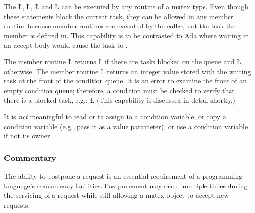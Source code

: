 \documentclass[openright,twoside]{report}
\begin{document}
\begin{annotation}
The \LGinlinetrue\LGbegin\lgrinde\L{}\endlgrinde\LGend{}, \LGinlinetrue\LGbegin\lgrinde\L{}\endlgrinde\LGend{}, \LGinlinetrue\LGbegin\lgrinde\L{}\endlgrinde\LGend{} and \LGinlinetrue\LGbegin\lgrinde\L{}\endlgrinde\LGend{} can be executed by any routine of a mutex type.
Even though these statements block the current task, they can be allowed in any member routine because member routines are executed by the caller, not the task the member is defined in.
This capability is to be contrasted to Ada where waiting in an accept body would cause the task to .
\end{annotation}

The member routine \LGinlinetrue\LGbegin\lgrinde\L{}\endlgrinde\LGend{} returns \LGinlinetrue\LGbegin\lgrinde\L{}\endlgrinde\LGend{} if there are tasks blocked on the queue and \LGinlinetrue\LGbegin\lgrinde\L{}\endlgrinde\LGend{} otherwise.
The member routine \LGinlinetrue\LGbegin\lgrinde\L{}\endlgrinde\LGend{} returns an integer value stored with the waiting task at the front of the condition queue.
It is an error to examine the front of an empty condition queue;
therefore, a condition must be checked to verify that there is a blocked task, e.g.:
\LGinlinefalse\LGbegin\lgrinde
\L{}
\endlgrinde\LGend
(This capability is discussed in detail shortly.)

It is \emph{not} meaningful to read or to assign to a condition variable, or copy a condition variable (e.g., pass it as a value parameter), or use a condition variable if not its owner.


\subsubsection{Commentary}
\label{s:PostponingRequests}

The ability to postpone a request is an essential requirement of a programming language's concurrency facilities.
Postponement may occur multiple times during the servicing of a request while still allowing a mutex object to accept new requests.
\end{document}
